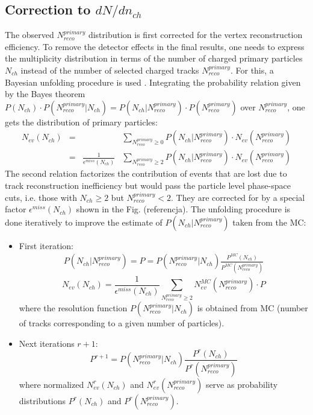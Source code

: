 \subsection{Correction to $dN/dn_{ch}$}
The observed $N^{primary}_{reco}$ distribution is first corrected for the vertex reconstruction efficiency.  To remove the detector effects in the final results, one needs to express the multiplicity distribution in terms
of the number of charged primary particles $N_{ch}$ instead of the number of selected charged tracks $N^{primary}_{reco}$. For
this, a Bayesian unfolding procedure is used \cite{DAGOSTINI1995487}. Integrating the probability relation given by the Bayes
theorem $P(N_{ch})\cdot P(N^{primary}_{reco}|N_{ch}) = P(N_{ch}|N^{primary}_{reco})\cdot P(N^{primary}_{reco})$ over $N^{primary}_{reco}$, one gets the distribution of primary particles:
\begin{equation}
\begin{array}{ccccc}
	N_{ev}(N_{ch})&=&&\sum_{N^{primary}_{reco}\geq0}P(N_{ch}|N^{primary}_{reco})\cdot N_{ev}(N^{primary}_{reco})\\
	&=&\frac{1}{\epsilon^{miss}(N_{ch})}&\sum_{N^{primary}_{reco}\geq2}P(N_{ch}|N^{primary}_{reco})\cdot N_{ev}(N^{primary}_{reco})
\end{array}
\end{equation}
The second relation factorizes the contribution of events that are lost due to track reconstruction inefficiency
but would pass the particle level phase-space cuts, i.e. those with $N_{ch}\geq2$ but $N^{primary}_{reco}<2$. They are corrected
for by a special factor $\epsilon^{miss}(N_{ch})$ shown in the Fig. (referencja). The unfolding procedure is done iteratively to improve the estimate of $P(N_{ch}|N^{primary}_{reco})$ taken from the MC:
\begin{itemize}
	\item First iteration: \\
\begin{eqnarray}
P(N_{ch}|N^{primary}_{reco}) = P = P(N^{primary}_{reco}|N_{ch})\frac{P^{MC}(N_{ch})}{P^{MC}(N^{primary}_{reco})}
\end{eqnarray}
\begin{equation}
N_{ev}(N_{ch})=\frac{1}{\epsilon^{miss}(N_{ch})}\sum_{N^{primary}_{reco}\geq2}N_{ev}^{MC}(N^{primary}_{reco})\cdot P
\end{equation}
where the resolution function $P(N^{primary}_{reco}|N_{ch})$ is obtained from MC (number of tracks corresponding to a given number of particles).

\item Next iterations $r+1$:
\begin{equation}
P^{r+1}=P(N^{primary}_{reco}|N_{ch})\frac{P^{r}(N_{ch})}{P^{r}(N^{primary}_{reco})}
\end{equation}
where normalized $N_{ev}^r(N_{ch})$ and $N_{ev}^r(N^{primary}_{reco})$ serve as probability distributions $P^{r}(N_{ch})$ and $P^{r}(N^{primary}_{reco})$.
\end{itemize}

